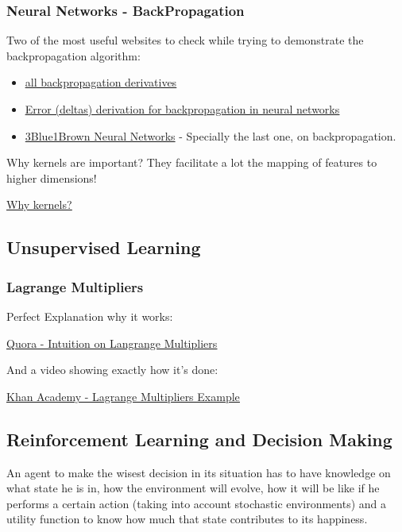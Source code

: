\subsubsection{Neural Networks - BackPropagation}

Two of the most useful websites to check while trying to demonstrate the backpropagation algorithm:
\begin{itemize}
    \item \href{https://medium.com/@pdquant/all-the-backpropagation-derivatives-d5275f727f60}{\ul{all backpropagation derivatives}}
    \item \href{https://stats.stackexchange.com/questions/94387/how-to-derive-errors-in-neural-network-with-the-backpropagation-algorithm}{\ul{Error (deltas) derivation for backpropagation in neural networks}}
    \item \href{https://www.youtube.com/playlist?list=PLZHQObOWTQDNU6R1_67000Dx_ZCJB-3pi}{3Blue1Brown Neural Networks} - Specially the last one, on backpropagation.
    
\end{itemize}



Why kernels are important? They facilitate a lot the mapping of features to higher dimensions!

\href{https://medium.com/@zxr.nju/what-is-the-kernel-trick-why-is-it-important-98a98db0961d}{\ul{Why kernels?}}



\subsection{Unsupervised Learning}

\subsubsection{Lagrange Multipliers}

Perfect Explanation why it works:

\href{https://www.quora.com/Why-does-the-method-of-Lagrange-multipliers-work-for-optimization-in-multivariable-calculus-Why-exactly-given-a-function-f-x-y-and-a-constraint-g-x-y-c-can-we-set-the-gradients-of-the-functions-to-be-multiples-of-each-other}{\ul{Quora - Intuition on Langrange Multipliers}}

And a video showing exactly how it's done:

\href{https://www.youtube.com/watch?v=yuqB-d5MjZA}{\ul{Khan Academy - Lagrange Multipliers Example}}



\subsection{Reinforcement Learning and Decision Making}


An agent to make the wisest decision in its situation has to have knowledge on what state he is in, how the environment will evolve, how it will be like if he performs a certain action (taking into account stochastic environments) and a utility function to  know how much that state contributes to its happiness.


